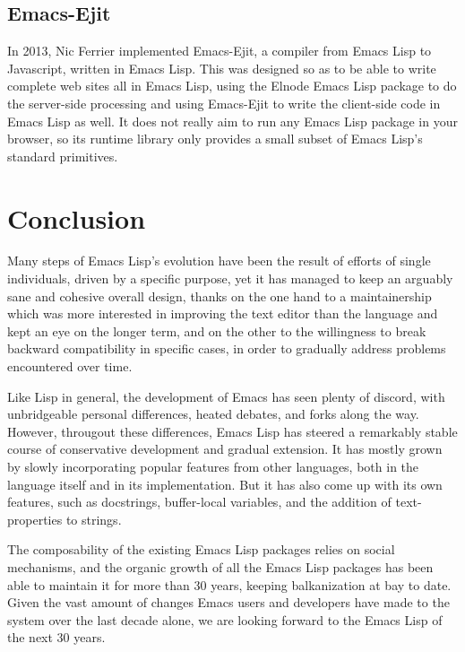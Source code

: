 \documentclass[format=acmsmall, review]{acmart}
\newcommand \Elisp {Emacs Lisp}
\begin{document}

\subsection{Emacs-Ejit}

In 2013, Nic Ferrier implemented Emacs-Ejit, a compiler from \Elisp{} to
Javascript, written in \Elisp{}.  This was designed so as to be able to write complete web sites
all in \Elisp{}, using the Elnode \Elisp{} package to do the server-side
processing and using Emacs-Ejit to write the client-side code in \Elisp{}
as well.  It does not really aim to run any \Elisp{} package in your
browser, so its runtime library only provides a small subset of \Elisp's
standard primitives.

\section{Conclusion}
\label{sec:conclusion}

Many steps of \Elisp's evolution have been the result of efforts of single
individuals, driven by a specific purpose, yet it has managed to keep an
arguably sane and cohesive overall design, thanks on the one hand to
a maintainership which was more interested in improving the text editor than
the language and kept an eye on the longer term, and on the other to the
willingness to break backward compatibility in specific cases, in order to
gradually address problems encountered over time.

Like Lisp in general, the development of Emacs has seen plenty of
discord, with unbridgeable personal differences, heated debates, and
forks along the way.  However, througout these differences, \Elisp{}
has steered a remarkably stable course of conservative development and
gradual extension.  It has mostly grown by slowly incorporating popular
features from other languages, both in the language itself and in its
implementation.  But it has also come up with its own features, such as
docstrings, buffer-local variables, and the addition of text-properties
to strings.

The composability of the existing \Elisp{} packages relies on social
mechanisms, and the organic growth of all the \Elisp{} packages has
been able to maintain it for more than 30 years, keeping balkanization
at bay to date.  Given the vast amount of changes Emacs users and
developers have made to the system over the last decade alone, we are
looking forward to the \Elisp{} of the next 30 years.
\end{document}
